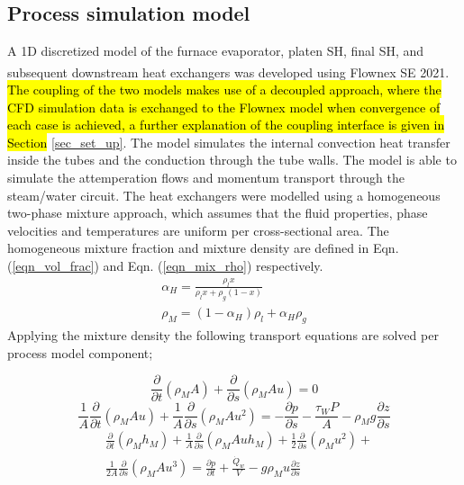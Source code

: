\documentclass[twocolumn,10pt]{asme2ej}
\begin{document}
\subsection{Process simulation model}
A 1D discretized model of the furnace evaporator, platen SH, final SH, and subsequent downstream heat exchangers was developed using Flownex SE\textsuperscript{\textregistered} 2021. \hl{The coupling of the two models makes use of a decoupled approach, where the CFD simulation data is exchanged to the Flownex model when convergence of each case is achieved, a further explanation of the coupling interface is given in Section} \ref{sec_set_up}. The model simulates the internal convection heat transfer inside the tubes and the conduction through the tube walls. The model is able to simulate the attemperation flows and momentum transport through the steam/water circuit. The heat exchangers were modelled using a homogeneous two-phase mixture approach, which assumes that the fluid properties, phase velocities and temperatures are uniform per cross-sectional area. The homogeneous mixture fraction and mixture density are defined in Eqn. (\ref{eqn_vol_frac}) and Eqn. (\ref{eqn_mix_rho}) respectively.
\begin{gather}
\alpha_H = \frac{\rho_l x}{\rho_lx + \rho_g(1-x)} \label{eqn_vol_frac}\\  
\rho_M = (1-\alpha_H)\rho_l + \alpha_H\rho_g \label{eqn_mix_rho}
\end{gather}
Applying the mixture density the following transport equations are solved per process model component;

\begin{equation}\label{eqn_mix_conti}
\frac{\partial}{\partial t}(\rho_M A)+\frac{\partial}{\partial s}(\rho_MAu) = 0
\end{equation}
\begin{equation}\label{eqn_mix_mom}
\frac{1}{A} \frac{\partial}{\partial t}(\rho_M A u)+\frac{1}{A} \frac{\partial}{\partial s}(\rho_M A u^2) = -\frac{\partial p}{\partial s}-\frac{\tau_W P}{A}- \rho_M g \frac{\partial z}{\partial s}
\end{equation}
\begin{equation}\label{eqn_mix_energy}
\begin{split}
&\frac{\partial}{\partial t}(\rho_Mh_M)+\frac{1}{A}\frac{\partial}{\partial s}(\rho_MAuh_M)+\frac{1}{2}\frac{\partial}{\partial s}(\rho_Mu^2)+\\
&\frac{1}{2A}\frac{\partial}{\partial s}(\rho_MAu^3)=\frac{\partial p}{\partial t} + \frac{\dot{Q}_w}{V}-g\rho_Mu\frac{\partial z}{\partial s}
\end{split}
\end{equation}
\end{document}
